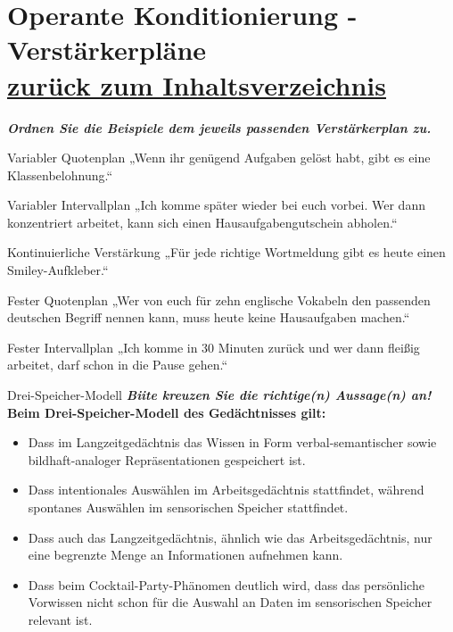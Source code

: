 \documentclass[a4paper]{article}
\newcommand{\ACorrectAnswer}{\rlap{$\square$}{\raisebox{2pt}{\large\hspace{1pt}\ding{51}}}\hspace{-2.5pt}}
\newcommand{\AWrongAnswer}{\rlap{$\square$}{\large\hspace{1pt}\ding{55}}}
\newcommand{\AnUnsureAnswer}{\rlap{$\square$}{\large\hspace{1pt}\textbf?}}
\newcommand{\defaultCorrect}{\ding{51}}
\newcommand{\defaultWrong}{\ding{55}}
\newcommand{\defaultUnsure}{\textbf{?}}
\newenvironment{answers}{\begin{itemize}}{\end{itemize}}
\newcommand{\correct}{\defaultCorrect}
\newcommand{\wrong}{\defaultWrong}
\newcommand{\unsure}{\defaultUnsure}
\newenvironment{question}[2]{%
    \section[#1 \normalfont(#2)]{#1\\\small\normalfont\hyperlink{tableofcontents}{zurück zum Inhaltsverzeichnis}}%
}{%
    \newpage%
}
\newcommand{\questiontext}[1]{\textbf{#1}}
\newcommand{\assignment}[1]{\textbf{\textit{#1}}\newline}
\newenvironment{multiple-choice}[1]{%
    \begin{question}{#1}{Multiple Choice}%
    \renewenvironment{answers}{%
        \begin{multiple-choice-list}}{\end{multiple-choice-list}%
    }%
    \renewcommand{\correct}{\ACorrectAnswer}%
    \renewcommand{\wrong}{\AWrongAnswer}%
    \renewcommand{\unsure}{\AnUnsureAnswer}%
}%
{%
    \renewcommand{\correct}{\defaultCorrect}%
    \renewcommand{\wrong}{\defaultWrong}%
    \renewcommand{\unsure}{\defaultUnsure}%
    \end{question}%
}
\newenvironment{mapping}[1]{%
    \begin{question}{#1}{Zuordnungsaufgabe}%
    \newcommand{\ismappedto}{\tcblower}%
    \newenvironment{answer}{\begin{mapping-box}}{\end{mapping-box}}%
}{%
    \end{question}%
}
\begin{document}
\begin{mapping}{Operante Konditionierung - Verstärkerpläne}
    \assignment{Ordnen Sie die Beispiele dem jeweils passenden Verstärkerplan zu.}
    \begin{answer}
        Variabler Quotenplan
        \ismappedto
        „Wenn ihr genügend Aufgaben gelöst habt, gibt es eine Klassenbelohnung.“
    \end{answer}
    \begin{answer}
        Variabler Intervallplan
        \ismappedto
        „Ich komme später wieder bei euch vorbei. Wer dann konzentriert arbeitet, kann sich einen Hausaufgabengutschein abholen.“
    \end{answer}
    \begin{answer}
        Kontinuierliche Verstärkung
        \ismappedto
        „Für jede richtige Wortmeldung gibt es heute einen Smiley-Aufkleber.“
    \end{answer}
    \begin{answer}
        Fester Quotenplan
        \ismappedto
        „Wer von euch für zehn englische Vokabeln den passenden deutschen Begriff nennen kann, muss heute keine Hausaufgaben machen.“
    \end{answer}
    \begin{answer}
        Fester Intervallplan
        \ismappedto
        „Ich komme in 30 Minuten zurück und wer dann fleißig arbeitet, darf schon in die Pause gehen.“
    \end{answer}
\end{mapping}

\begin{multiple-choice}{Drei-Speicher-Modell}
    \assignment{Biite kreuzen Sie die richtige(n) Aussage(n) an!}
    \questiontext{Beim Drei-Speicher-Modell des Gedächtnisses gilt:}
    \begin{answers}
        \item[\correct] Dass im Langzeitgedächtnis das Wissen in Form verbal-semantischer sowie bildhaft-analoger Repräsentationen gespeichert ist.
        \item[\correct] Dass intentionales Auswählen im Arbeitsgedächtnis stattfindet, während spontanes Auswählen im sensorischen Speicher stattfindet.
        \item[\wrong] Dass auch das Langzeitgedächtnis, ähnlich wie das Arbeitsgedächtnis, nur eine begrenzte Menge an Informationen aufnehmen kann.
        \item[\wrong] Dass beim Cocktail-Party-Phänomen deutlich wird, dass das persönliche Vorwissen nicht schon für die Auswahl an Daten im sensorischen Speicher relevant ist.
    \end{answers}
\end{multiple-choice}
\end{document}
